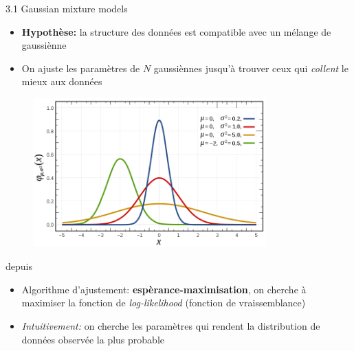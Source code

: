 \begin{frame}{3.1 Gaussian mixture models}
  \begin{itemize}
  \item \textbf{Hypothèse:} la structure des données est compatible avec un mélange de gaussiènne
  \end{itemize}
  \begin{minipage}{0.48\textwidth}
    \begin{itemize}
    \item On ajuste les paramètres de $N$ gaussiènnes jusqu'à trouver ceux qui \textit{collent} le mieux aux données
    \end{itemize}
  \end{minipage}
  \begin{minipage}{0.48\textwidth}
    \begin{figure}
      \includegraphics[width=0.8\textwidth]{fig/gaussianFct.png}
    \end{figure}
    \tiny
    \vspace{-0.9cm}
    \begin{center}
      depuis \href{https://en.wikipedia.org/wiki/Gaussian_function}{\color{blue}{Wikipedia}}
    \end{center}
  \end{minipage}
  \begin{itemize}
  \item Algorithme d'ajustement: \textbf{espèrance-maximisation}, on cherche à maximiser la fonction de \textit{log-likelihood} (fonction de vraissemblance)
  \item \textit{Intuitivement:} on cherche les paramètres qui rendent la distribution de données observée la plus probable
  \end{itemize}
\end{frame}

